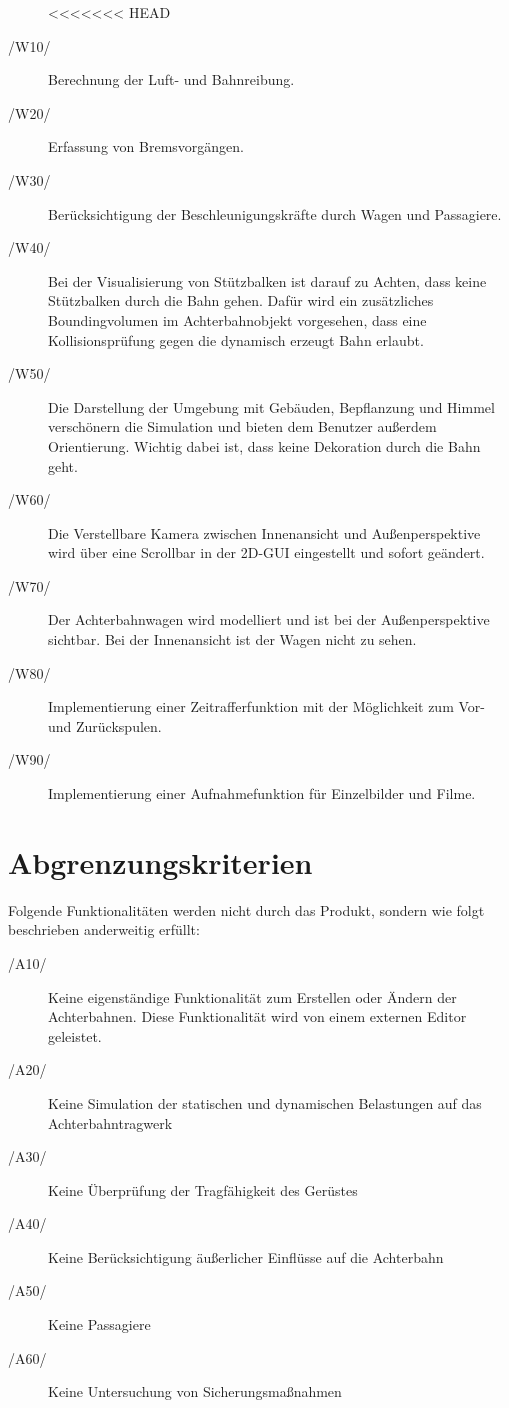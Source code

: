 \begin{description}
<<<<<<< HEAD
	\item[/W10/] Berechnung der Luft- und Bahnreibung.
	\item[/W20/] Erfassung von Bremsvorgängen.
	\item[/W30/] Berücksichtigung der Beschleunigungskräfte durch Wagen und Passagiere.
	\item[/W40/] Bei der Visualisierung von Stützbalken ist darauf zu Achten, dass keine Stützbalken durch die Bahn gehen. Dafür wird ein zusätzliches Boundingvolumen im Achterbahnobjekt vorgesehen, dass eine Kollisionsprüfung gegen die dynamisch erzeugt Bahn erlaubt.
	\item[/W50/] Die Darstellung der Umgebung mit Gebäuden, Bepflanzung und Himmel verschönern die Simulation und bieten dem Benutzer außerdem Orientierung. Wichtig dabei ist, dass keine Dekoration durch die Bahn geht.
	\item[/W60/] Die Verstellbare Kamera zwischen Innenansicht und Außenperspektive wird über eine Scrollbar in der 2D-GUI eingestellt und sofort geändert.
	\item[/W70/] Der Achterbahnwagen wird modelliert und ist bei der Außenperspektive sichtbar. Bei der Innenansicht ist der Wagen nicht zu sehen.
	\item[/W80/] Implementierung einer Zeitrafferfunktion mit der Möglichkeit zum Vor- und Zurückspulen.
	\item[/W90/] Implementierung einer Aufnahmefunktion für Einzelbilder und Filme.
\end{description}

\section{Abgrenzungskriterien}
Folgende Funktionalitäten werden nicht durch das Produkt, sondern wie folgt
beschrieben anderweitig erfüllt:
\begin{description}
	\item[/A10/] Keine eigenständige Funktionalität zum Erstellen oder Ändern der Achterbahnen. Diese Funktionalität wird von einem externen Editor geleistet.
	\item[/A20/] Keine Simulation der statischen und dynamischen Belastungen auf das Achterbahntragwerk
	\item[/A30/] Keine Überprüfung der Tragfähigkeit des Gerüstes
	\item[/A40/] Keine Berücksichtigung äußerlicher Einflüsse auf die Achterbahn
	\item[/A50/] Keine Passagiere
	\item[/A60/] Keine Untersuchung von Sicherungsmaßnahmen
\end{description}